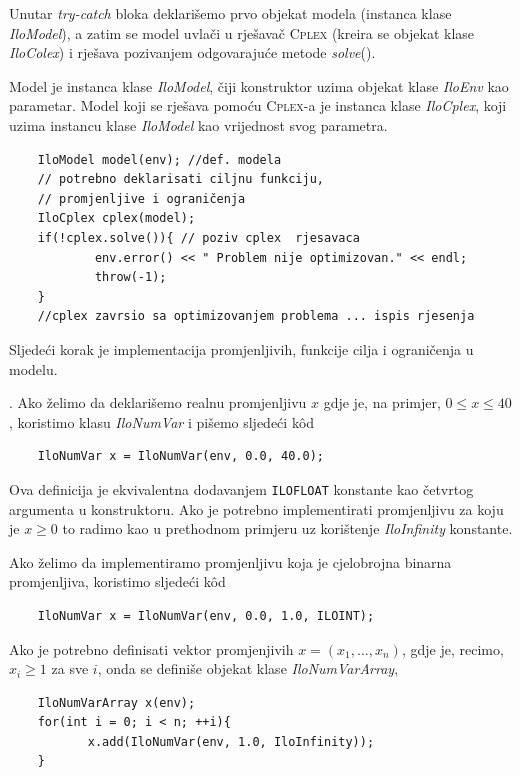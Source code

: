 \documentclass[b5paper, utf8, 11pt, colorlinks]{book}
\theoremstyle{definition}
\begin{document}
 \noindent Unutar \emph{try-catch} bloka deklarišemo prvo objekat modela (instanca klase \emph{IloModel}), a zatim se model uvlači u rješavač \textsc{Cplex} (kreira se objekat klase \emph{IloColex}) i rješava pozivanjem odgovarajuće metode \emph{solve}().
 
 Model je instanca klase \emph{IloModel}, čiji konstruktor uzima objekat klase \emph{IloEnv} kao parametar. Model koji se rješava pomoću \textsc{Cplex}-a je instanca klase \emph{IloCplex}, koji uzima instancu klase \emph{IloModel} kao vrijednost svog parametra.  
   
 

 \begin{verbatim}
 	IloModel model(env); //def. modela
 	// potrebno deklarisati ciljnu funkciju,
 	// promjenljive i ograničenja
 	IloCplex cplex(model);
 	if(!cplex.solve()){ // poziv cplex  rjesavaca
 		    env.error() << " Problem nije optimizovan." << endl;
 		    throw(-1);
 	}
 	//cplex zavrsio sa optimizovanjem problema ... ispis rjesenja
 \end{verbatim}
 
 \noindent Sljedeći korak je implementacija promjenljivih, funkcije cilja i ograničenja u modelu. 
 
 . Ako želimo da deklarišemo realnu promjenljivu $x$ gdje je, na primjer, $0 \leq x \leq 40$, koristimo klasu \emph{IloNumVar} i pišemo sljedeći k\^od
 \begin{verbatim}
 	IloNumVar x = IloNumVar(env, 0.0, 40.0);
 \end{verbatim}
 Ova definicija je ekvivalentna dodavanjem  \texttt{ILOFLOAT} konstante kao četvrtog argumenta u  konstruktoru. 
Ako je potrebno implementirati promjenljivu za koju je $x \geq 0$ to radimo kao u prethodnom primjeru uz korištenje  \emph{IloInfinity} konstante.
 
 Ako želimo da implementiramo promjenljivu koja je cjelobrojna binarna promjenljiva, koristimo sljedeći k\^od
 \begin{verbatim}
 	IloNumVar x = IloNumVar(env, 0.0, 1.0, ILOINT);
 \end{verbatim}
 \noindent Ako je potrebno definisati vektor promjenjivih $x=(x_1,...,x_n)$, gdje je, recimo, $x_i \geq 1$ za sve $i$, onda se definiše objekat klase \emph{IloNumVarArray},
 \begin{verbatim}
 	IloNumVarArray x(env);
 	for(int i = 0; i < n; ++i){
 		   x.add(IloNumVar(env, 1.0, IloInfinity));
 	}
 \end{verbatim}
 
\end{document}
